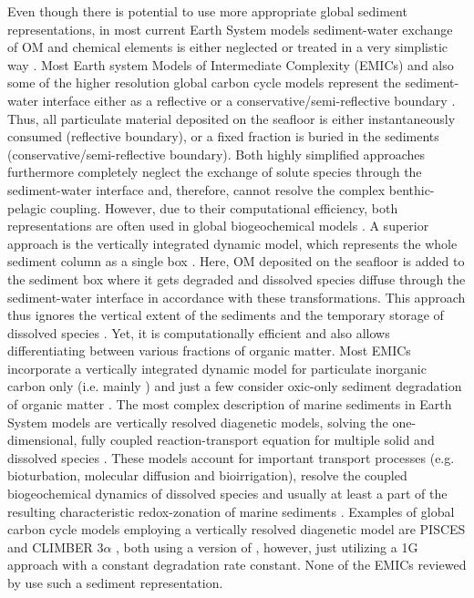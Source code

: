 \documentclass[gmd, manuscript]{copernicus}
\begin{document}
Even though there is potential to use more appropriate global sediment representations, in most current Earth System models sediment-water exchange of OM and chemical elements is either neglected or treated in a very 
simplistic way \citep{soetaert_coupling_2000, huelse_biopump_models_2017}. 
Most Earth system Models of Intermediate Complexity (EMICs) and also some of the higher resolution global carbon cycle models represent the sediment-water interface either as a reflective or a conservative/semi-reflective boundary 
\citep{huelse_biopump_models_2017}. 
Thus, all particulate material deposited on the seafloor is either instantaneously consumed (reflective boundary), or a fixed fraction is buried in the sediments (conservative/semi-reflective boundary). 
Both highly simplified approaches furthermore completely neglect the exchange of solute species through the sediment-water interface and, therefore, cannot resolve the complex benthic-pelagic coupling. 
However, due to their computational efficiency, both representations are often used in global biogeochemical models \citep[e.g.][]{najjar_impact_2007, ridgwell_marine_2007, goosse_description_2010}. 
A superior approach is the vertically integrated dynamic model, which represents the whole sediment column as a single box \citep{huelse_biopump_models_2017}. Here, OM deposited on the seafloor is added 
to the sediment box where it gets degraded and dissolved species diffuse through the sediment-water interface in accordance with these transformations. 
This approach thus ignores the vertical extent of the sediments and the temporary storage of dissolved species \citep{soetaert_coupling_2000}. Yet, it is computationally efficient and 
also allows differentiating between various fractions of organic matter. Most EMICs incorporate a vertically integrated dynamic model for particulate inorganic carbon only (i.e. mainly ) and just a few  
consider oxic-only sediment degradation of organic matter \citep{huelse_biopump_models_2017}. 
The most complex description of marine sediments in Earth System models are vertically resolved diagenetic models, solving the one-dimensional, fully coupled reaction-transport equation for multiple solid and dissolved species 
\citep[e.g.][]{berner_early_1980, boudreau1997diagenetic}. These models account for important transport processes (e.g. bioturbation, molecular diffusion and bioirrigation), resolve the coupled biogeochemical dynamics of dissolved species
and usually at least a part of the resulting characteristic redox-zonation of marine sediments \citep{soetaert_coupling_2000}. Examples of global carbon cycle models employing a vertically resolved diagenetic model are 
PISCES \citep{gehlen_reconciling_2006} and CLIMBER 3$\alpha$ \citep{ilyina_global_2013}, both using a version of \citet{heinze_global_1999}, however, just utilizing a 1G approach with a constant degradation rate constant. %
None of the EMICs reviewed by \citet{huelse_biopump_models_2017} use such a sediment representation. 
\end{document}
